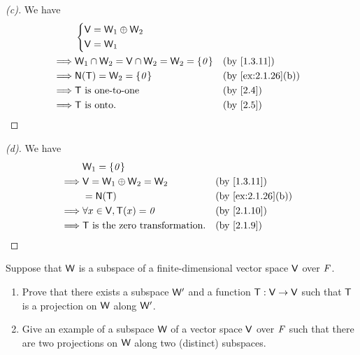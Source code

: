 \begin{proof}[(c)]
  We have
  \begin{align*}
             & \begin{dcases}
      \V = \W_1 \oplus \W_2 \\
      \V = \W_1
    \end{dcases}                                                            \\
    \implies & \W_1 \cap \W_2 = \V \cap \W_2 = \W_2 = \set{\zv} &  & \text{(by \cref{1.3.11})}       \\
    \implies & \ns{\T} = \W_2 = \set{\zv}                       &  & \text{(by \cref{ex:2.1.26}(b))} \\
    \implies & \T \text{ is one-to-one}                         &  & \text{(by \cref{2.4})}          \\
    \implies & \T \text{ is onto}.                              &  & \text{(by \cref{2.5})}
  \end{align*}
\end{proof}

\begin{proof}[(d)]
  We have
  \begin{align*}
             & \W_1 = \set{\zv}                                                            \\
    \implies & \V = \W_1 \oplus \W_2 = \W_2           &  & \text{(by \cref{1.3.11})}       \\
             & = \ns{\T}                              &  & \text{(by \cref{ex:2.1.26}(b))} \\
    \implies & \forall x \in \V, \T(x) = \zv          &  & \text{(by \cref{2.1.10})}       \\
    \implies & \T \text{ is the zero transformation}. &  & \text{(by \cref{2.1.9})}
  \end{align*}
\end{proof}

\begin{ex}\label{ex:2.1.27}
  Suppose that \(\mathsf{W}\) is a subspace of a finite-dimensional vector space \(\mathsf{V}\) over \(\mathit{F}\).
  \begin{enumerate}
    \item Prove that there exists a subspace \(\mathsf{W}'\) and a function \(\mathsf{T} : \mathsf{V} \to \mathsf{V}\) such that \(\mathsf{T}\) is a projection on \(\mathsf{W}\) along \(\mathsf{W}'\).
    \item Give an example of a subspace \(\mathsf{W}\) of a vector space \(\mathsf{V}\) over \(\mathit{F}\) such that there are two projections on \(\mathsf{W}\) along two (distinct) subspaces.
  \end{enumerate}
\end{ex}

